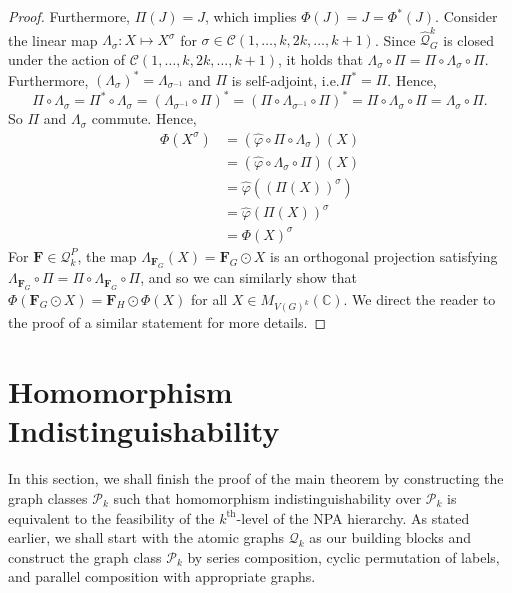 \documentclass[a4paper,onecolumn,11pt,accepted=2026-01-06]{quantumarticle}
\theoremstyle{plain}
\theoremstyle{remark}
\theoremstyle{definition}
\newcommand{\complex}{\mathbb{C}}
\def\calP{{\mathcal P}} \def\calQ{{\mathcal Q}} \def\calR{{\mathcal R}}
\newcommand{\cyclicpermutations}{\mathscr{C}(1,\dots, k, 2k, \dots, k+1)}
\begin{document}
\begin{proof}
		Furthermore, $\Pi(J) = J$, which implies $\Phi(J) =J = \Phi^*(J)$. Consider the linear map $\Lambda_\sigma \colon X \mapsto X^\sigma$ for $\sigma \in \cyclicpermutations$. Since $\widehat{\mathcal{Q}}^k_G$ is closed under the action of $\cyclicpermutations$, it holds that $\Lambda_\sigma \circ \Pi = \Pi \circ \Lambda_\sigma \circ \Pi $. Furthermore, $(\Lambda_{\sigma})^{*} = \Lambda_{\sigma^{-1}}$ and $\Pi$ is self-adjoint, i.e.\@ $\Pi^* = \Pi$. Hence,
		\[
		\Pi \circ \Lambda_{\sigma}
		= \Pi^* \circ \Lambda_\sigma
		= (\Lambda_{\sigma^{-1}} \circ \Pi)^*
		= (\Pi \circ \Lambda_{\sigma^{-1}} \circ \Pi)^*
		= \Pi \circ \Lambda_{\sigma} \circ \Pi
		= \Lambda_\sigma \circ \Pi.
		\]
		So $\Pi$ and $\Lambda_\sigma$ commute. Hence,
		\begin{align*}
		\Phi(X^\sigma) & = (\widehat{\varphi} \circ \Pi \circ \Lambda_\sigma)(X) \\
			& = (\widehat{\varphi} \circ \Lambda_\sigma \circ \Pi )(X) \\
            & = \widehat{\varphi} ((\Pi(X))^{\sigma}) \\
            & =  \widehat{\varphi}(\Pi(X))^{\sigma} \\
			& = \Phi(X)^\sigma
		\end{align*}
    For $\boldsymbol{F} \in \calQ_k^P$, the map $\Lambda_{\boldsymbol{F}_G}(X) = \boldsymbol{F}_G \odot X$ is an orthogonal projection satisfying $\Lambda_{\boldsymbol{F}_G} \circ \Pi = \Pi \circ \Lambda_{\boldsymbol{F}_G} \circ \Pi$, and so we can similarly show that $\Phi(\boldsymbol{F}_G \odot X) = \boldsymbol{F}_H \odot \Phi(X)$ for all $X \in M_{V(G)^k}(\complex)$. We direct the reader to the proof of a similar statement \cite[Theorem 6.2]{david_mathprog} for more details. 
\end{proof}

\section{Homomorphism Indistinguishability}\label{sec:hom-ind}

In this section, we shall finish the proof of the main theorem by constructing the graph classes $\calP_k$ such that homomorphism indistinguishability over $\mathcal{P}_k$ is equivalent to the feasibility of the $k^{\text{th}}$-level of the NPA hierarchy. As stated earlier, we shall start with the atomic graphs $\calQ_k$ as our building blocks and construct the graph class $\calP_k$ by series composition, cyclic permutation of labels, and parallel composition with appropriate graphs. 
\end{document}
